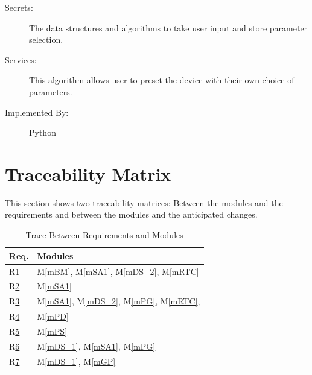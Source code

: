 \documentclass[12pt, titlepage]{article}
\newcommand{\mref}[1]{M\ref{#1}}
\begin{document}
\begin{description}
  \item[Secrets:] The data structures and algorithms to take user input and store parameter selection.
  \item[Services:] This algorithm allows user to preset the device with their own choice of parameters.
  \item[Implemented By:] Python
\end{description}

\section{Traceability Matrix} \label{SecTM}

This section shows two traceability matrices: Between the modules and the
requirements and between the modules and the anticipated changes.

\begin{table}[H]
  \centering
  \begin{tabular}{p{} p{}}
    \toprule
    \textbf{Req.} & \textbf{Modules}                                                                           \\
    \midrule
    R\href{https://github.com/zakerl/Capstone_Project/blob/main/docs/SRS/SRS.pdf}{1}            & \mref{mBM}, \mref{mSA1}, \mref{mDS_2}, \mref{mRTC}                               \\
    R\href{https://github.com/zakerl/Capstone_Project/blob/main/docs/SRS/SRS.pdf}{2}            & \mref{mSA1} \\
    R\href{https://github.com/zakerl/Capstone_Project/blob/main/docs/SRS/SRS.pdf}{3}            & \mref{mSA1}, \mref{mDS_2}, \mref{mPG}, \mref{mRTC},                                                                             \\
    R\href{https://github.com/zakerl/Capstone_Project/blob/main/docs/SRS/SRS.pdf}{4}            & \mref{mPD}                                                    \\
    R\href{https://github.com/zakerl/Capstone_Project/blob/main/docs/SRS/SRS.pdf}{5}            & \mref{mPS} \\
    R\href{https://github.com/zakerl/Capstone_Project/blob/main/docs/SRS/SRS.pdf}{6}            &\mref{mDS_1}, \mref{mSA1}, \mref{mPG}\\
    R\href{https://github.com/zakerl/Capstone_Project/blob/main/docs/SRS/SRS.pdf}{7}           &\mref{mDS_1}, \mref{mGP}             \\
    \bottomrule
  \end{tabular}
  \caption{Trace Between Requirements and Modules}
  \label{TblRT}
\end{table}
\end{document}
